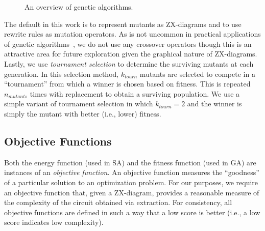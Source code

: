\begin{figure}
\centering
{}
\caption{An overview of genetic algorithms.}
\label{fig:ga}
\end{figure}

The default in this work is to represent mutants as ZX-diagrams and to use rewrite rules as mutation operators.
As is not uncommon in practical applications of genetic algorithms~\cite{chellapilla1997evolving, spears1991study, de1990genetic}, we do not use any crossover operators though this is an attractive area for future exploration given the graphical nature of ZX-diagrams. %
Lastly, we use \emph{tournament selection} to determine the surviving mutants at each generation.
In this selection method, $k_{tourn}$ mutants are selected to compete in a ``tournament'' from which a winner is chosen based on fitness.
This is repeated $n_{mutants}$ times with replacement to obtain a surviving population.
We use a simple variant of tournament selection in which $k_{tourn} = 2$ and the winner is simply the mutant with better (i.e., lower) fitness.


\subsection{Objective Functions}\label{sec:obj-funcs}


Both the energy function (used in SA) and the fitness function (used in GA) are instances of an \emph{objective function}.
An objective function measures the ``goodness'' of a particular solution to an optimization problem.
For our purposes, we require an objective function that, given a ZX-diagram, provides a reasonable measure of the complexity of the circuit obtained via extraction.
For consistency, all objective functions are defined in such a way that a low score is better (i.e., a low score indicates low complexity).

